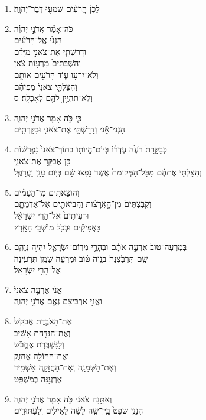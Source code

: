 \documentclass[12pt,a4paper,titlepage]{article}
\def \pslabelsep{-0.9em} %
\def \psleftmargin{0em} %
\begin{document}
\begin{enumerate}[leftmargin=\psleftmargin, labelsep = \pslabelsep, label={\arabic*}, font=\color{\pscolor}\small\textsuperscript, parsep=0em, itemsep=0em, topsep=0em ]
\item \texthebrew{לָכֵן֙ הָֽרֹעִ֔ים שִׁמְע֖וּ דְּבַר־יְהוָֽה׃}
\item \texthebrew{כֹּה־אָמַ֞ר אֲדֹנָ֣י יְהוִ֗ה \\ הִנְנִ֙י אֶֽל־הָרֹעִ֜ים \\ וְֽדָרַשְׁתִּ֧י אֶת־צֹאנִ֣י מִיָּדָ֗ם \\ וְהִשְׁבַּתִּים֙ מֵרְע֣וֹת צֹ֔אן \\ וְלֹא־יִרְע֥וּ ע֛וֹד הָרֹעִ֖ים אוֹתָ֑ם \\ וְהִצַּלְתִּ֤י צֹאנִי֙ מִפִּיהֶ֔ם \\ וְלֹֽא־תִהְיֶ֥יןָ לָהֶ֖ם לְאָכְלָֽה׃ ס}\parSpace

\item \texthebrew{כִּ֛י כֹּ֥ה אָמַ֖ר אֲדֹנָ֣י יְהוִ֑ה \\ הִנְנִי־אָ֕נִי וְדָרַשְׁתִּ֥י אֶת־צֹאנִ֖י וּבִקַּרְתִּֽים׃}
\item \texthebrew{כְּבַקָּרַת֩ רֹעֶ֙ה עֶדְר֜וֹ בְּיוֹם־הֱיוֹת֤וֹ בְתוֹךְ־צֹאנוֹ֙ נִפְרָשׁ֔וֹת \\ כֵּ֖ן אֲבַקֵּ֣ר אֶת־צֹאנִ֑י \\ וְהִצַּלְתִּ֣י אֶתְהֶ֗ם מִכָּל־הַמְּקוֹמֹת֙ אֲשֶׁ֣ר נָפֹ֣צוּ שָׁ֔ם בְּי֥וֹם עָנָ֖ן וַעֲרָפֶֽל׃}
\item \texthebrew{וְהוֹצֵאתִ֣ים מִן־הָעַמִּ֗ים \\ וְקִבַּצְתִּים֙ מִן־הָ֣אֲרָצ֔וֹת וַהֲבִיאֹתִ֖ים אֶל־אַדְמָתָ֑ם \\ וּרְעִיתִים֙ אֶל־הָרֵ֣י יִשְׂרָאֵ֔ל \\ בָּאֲפִיקִ֕ים וּבְכֹ֖ל מוֹשְׁבֵ֥י הָאָֽרֶץ׃}
\item \texthebrew{בְּמִרְעֶה־טּוֹב֙ אֶרְעֶ֣ה אֹתָ֔ם וּבְהָרֵ֥י מְרֽוֹם־יִשְׂרָאֵ֖ל יִהְיֶ֣ה נְוֵהֶ֑ם \\ שָׁ֤ם תִּרְבַּ֙צְנָה֙ בְּנָ֣וֶה טּ֔וֹב וּמִרְעֶ֥ה שָׁמֵ֛ן תִּרְעֶ֖ינָה \\ אֶל־הָרֵ֥י יִשְׂרָאֵֽל׃}
\item \texthebrew{אֲנִ֙י אֶרְעֶ֤ה צֹאנִי֙ \\ וַאֲנִ֣י אַרְבִּיצֵ֔ם נְאֻ֖ם אֲדֹנָ֥י יְהוִֽה׃}
\item \texthebrew{אֶת־הָאֹבֶ֤דֶת אֲבַקֵּשׁ֙ \\ וְאֶת־הַנִּדַּ֣חַת אָשִׁ֔יב \\ וְלַנִּשְׁבֶּ֣רֶת אֶחֱבֹ֔שׁ \\ וְאֶת־הַחוֹלָ֖ה אֲחַזֵּ֑ק \\ וְאֶת־הַשְּׁמֵנָ֧ה וְאֶת־הַחֲזָקָ֛ה אַשְׁמִ֖יד \\ אֶרְעֶ֥נָּה בְמִשְׁפָּֽט׃}
\item \texthebrew{וְאַתֵּ֣נָה צֹאנִ֔י כֹּ֥ה אָמַ֖ר אֲדֹנָ֣י יְהוִ֑ה \\ הִנְנִ֤י שֹׁפֵט֙ בֵּֽין־שֶׂ֣ה לָשֶׂ֔ה לָאֵילִ֖ים וְלָעַתּוּדִֽים׃}

\end{enumerate}
\end{document}
